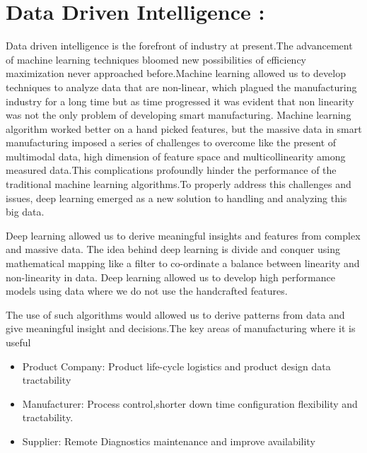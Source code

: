 \documentclass{article}
\begin{document}
\begin{normalsize}
\begin{itemize}
				\end{itemize}
	
	
       \section{Data Driven Intelligence :}
       		Data driven intelligence is the forefront of industry at present.The advancement of machine learning techniques bloomed new possibilities of efficiency maximization never approached before.Machine learning allowed us to develop techniques to analyze data that are non-linear, which plagued the manufacturing industry for a long time but as time progressed it was evident that non linearity was not the only problem of developing smart manufacturing. Machine learning algorithm worked better on a hand picked features, but the massive data in smart manufacturing imposed a series of challenges to overcome like the present of multimodal data, high dimension of feature space and multicollinearity among measured data.This complications profoundly hinder the performance of the traditional machine learning algorithms.To properly address this challenges and issues, deep learning emerged as a new solution to handling and analyzing this big data.
       		
       		Deep learning allowed us to derive meaningful insights and features from complex and massive data. The idea behind deep learning is divide and conquer using mathematical mapping like a filter to co-ordinate a balance between linearity and non-linearity in data. Deep learning allowed us to develop high performance models using data where we do not use the handcrafted features.
       		
        	The use of such algorithms would allowed us to derive patterns from data and give meaningful insight and decisions.The key areas of manufacturing where it is useful
        	   
             \begin{itemize}
        
\item{ Product Company: Product life-cycle logistics and product design data tractability }
\item{ Manufacturer: Process control,shorter down time configuration flexibility and tractability.
} 
\item{ Supplier: Remote Diagnostics maintenance and improve availability }



        \end{itemize}
        

\end{normalsize}
\end{document}
